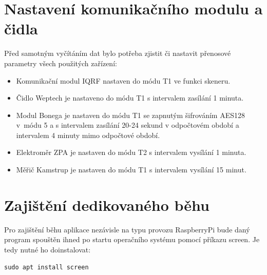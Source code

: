 
\section{Nastavení komunikačního modulu a čidla}

Před samotným vyčítáním dat bylo potřeba zjistit či nastavit přenosové parametry všech použitých zařízení:

\begin{itemize}
	\item Komunikační modul IQRF nastaven do módu T1 ve funkci skeneru.
	\item Čidlo Weptech je nastaveno do módu T1 s intervalem zasílání 1 minuta. 
	\item Modul Bonega je nastaven do módu T1 se zapnutým šifrováním AES128 v~módu 5 a s intervalem zasílání 20-24 sekund v odpočtovém období a intervalem 4 minuty mimo odpočtové období.
	\item Elektroměr ZPA je nastaven do módu T2 s intervalem vysílání 1 minuta.
	\item Měřič Kamstrup je nastaven do módu T1 s intervalem vysílání 15 minut.
\end{itemize}


\section{Zajištění dedikovaného běhu}
Pro zajištění běhu aplikace nezávisle na typu provozu RaspberryPi bude daný program spouštěn ihned po startu operačního systému pomocí příkazu screen. Je tedy nutné ho doinstalovat:
 
\begin{lstlisting}[style=MyCodeBash]
		sudo apt install screen		
	\end{lstlisting}



